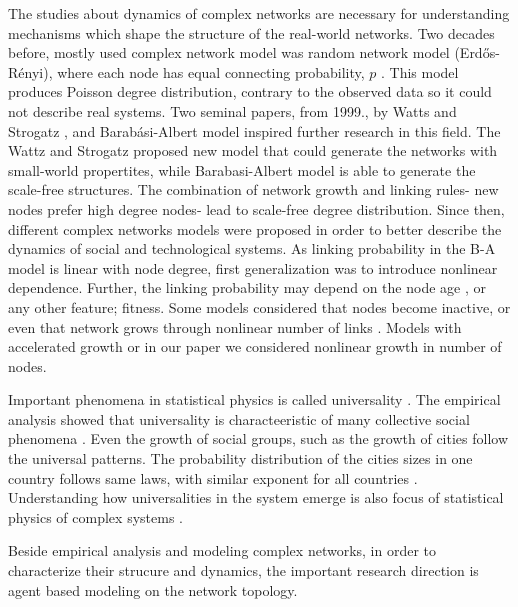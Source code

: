 The studies about dynamics of complex networks are necessary for understanding mechanisms which shape the structure of the real-world networks. Two decades before, mostly used complex network model was random network model (Erdős-Rényi), where each node has equal connecting probability, $p$ \cite{dorogovtsev2010complex}. This model produces Poisson degree distribution, contrary to the observed data so it could not describe real systems. Two seminal papers, from 1999., by Watts and Strogatz \cite{watts1998collective}, and Barabási-Albert model \cite{barabasi1999} inspired further research in this field. The Wattz and Strogatz  \cite{watts1998collective} proposed new model that could generate the networks with small-world propertites, while Barabasi-Albert model is able to generate the scale-free structures. The combination of network growth and linking rules- new nodes prefer high degree nodes- lead to scale-free degree distribution. Since then, different complex networks models were proposed in order to better describe the dynamics of social and technological systems. As linking probability in the B-A model is linear with node degree, first generalization was to introduce nonlinear dependence. Further, the linking probability may depend on the node age \cite{dorogovtsev2000b, dorogovtsev2001b}, or any other feature; fitness. Some models considered that nodes become inactive, or even that network grows through nonlinear number of links \cite{pham2016}. Models with accelerated growth \cite{sen2004} or in our paper we considered nonlinear growth in number of nodes. 

Important phenomena in statistical physics is called universality \cite{binney1992}. The empirical analysis showed that universality is characteeristic of many collective social phenomena  \cite{chatterjee2013, radicchi2008}. Even the growth of social groups, such as the growth of cities follow the universal patterns. The probability distribution of the cities sizes in one country follows same laws, with similar exponent for all countries \cite{barthelemy2019}. Understanding how universalities in the system emerge is also focus of statistical physics of complex systems \cite{verbavatz2020}. 

Beside empirical analysis and modeling complex networks, in order to characterize their strucure and dynamics, the important research direction is agent based modeling on the network topology.   


